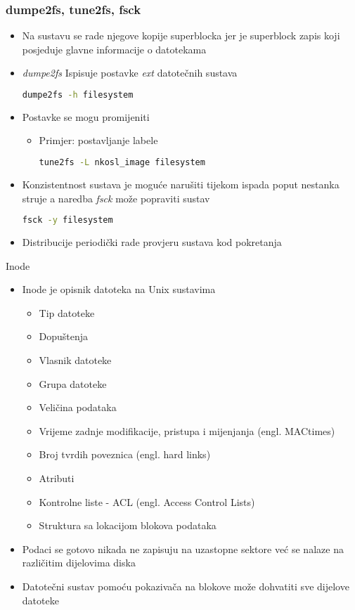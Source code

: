 \documentclass[croatian,t]{beamer} %
\begin{document}
	\begin{frame}[fragile]
	\frametitle{dumpe2fs, tune2fs, fsck}
		\begin{itemize}
			\item Na sustavu se rade njegove kopije superblocka jer je superblock zapis koji posjeduje glavne informacije o datotekama
			\item \textit{dumpe2fs} Ispisuje postavke \textit{ext} datotečnih sustava
			\begin{lstlisting}[basicstyle={\footnotesize\ttfamily},language=bash]
			dumpe2fs -h filesystem
			\end{lstlisting}
			\item Postavke se mogu promijeniti
			\begin{itemize}
				\item Primjer: postavljanje labele
				\begin{lstlisting}[basicstyle={\footnotesize\ttfamily},language=bash]
				tune2fs -L nkosl_image filesystem
				\end{lstlisting}
			\end{itemize}
			\item Konzistentnost sustava je moguće narušiti tijekom ispada poput nestanka struje a naredba \textit{fsck} može popraviti sustav
			\begin{lstlisting}[basicstyle={\footnotesize\ttfamily},language=bash]
			fsck -y filesystem
			\end{lstlisting}
			\item Distribucije periodički rade provjeru sustava kod pokretanja
		\end{itemize}
	\end{frame}
	
	\begin{frame}{Inode}
		\begin{itemize}
			\item Inode je opisnik datoteka na Unix sustavima
			\begin{itemize}
			\item Tip datoteke
			\item Dopuštenja
			\item Vlasnik datoteke
			\item Grupa datoteke
			\item Veličina podataka
			\item Vrijeme zadnje modifikacije, pristupa i mijenjanja (engl. MACtimes)
			\item Broj tvrdih poveznica (engl. hard links)
			\item Atributi
			\item Kontrolne liste - ACL (engl. Access Control Lists)
			\item Struktura sa lokacijom blokova podataka
			\end{itemize}
			\item Podaci se gotovo nikada ne zapisuju na uzastopne sektore već se nalaze na različitim dijelovima diska
			\item Datotečni sustav pomoću pokazivača na blokove može dohvatiti sve dijelove datoteke
		\end{itemize}
	\end{frame}
	
\end{document}
